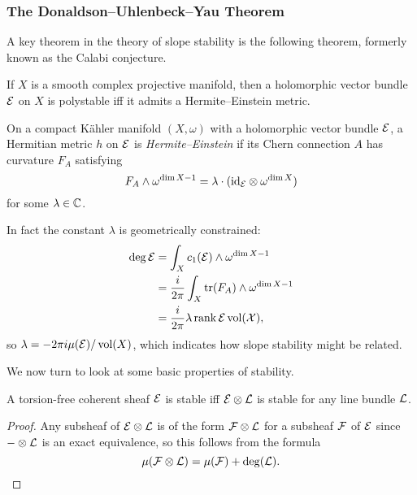 
\subsubsection{The Donaldson--Uhlenbeck--Yau Theorem}

A key theorem in the theory of slope stability is the following theorem,
formerly known as the Calabi conjecture.

\begin{theorem}
    If $X$ is a smooth complex projective manifold, then a holomorphic vector
    bundle $\mathcal{E}$ on $X$ is polystable iff it admits a Hermite--Einstein
    metric.
\end{theorem}

\begin{definition}
    On a compact K\"ahler manifold $(X,\omega)$ with a holomorphic vector bundle
    $\mathcal{E}$, a Hermitian metric $h$ on $\mathcal{E}$ is \emph{Hermite--Einstein} if
    its Chern connection $A$ has curvature $F_A$ satisfying
    \begin{equation*}
        F_A\wedge\omega^{\dim X-1}
            = \lambda\cdot(\mathrm{id}_{\mathcal{E}}\otimes\omega^{\dim X})
    \end{equation*}
    for some $\lambda\in\mathbb{C}$.
\end{definition}

In fact the constant $\lambda$ is geometrically constrained:
\begin{align*}
    \deg\mathcal{E}
        &= \int_Xc_1(\mathcal{E})\wedge\omega^{\dim X-1} \\
        &= \frac{i}{2\pi}\int_X\operatorname{tr}(F_A)\wedge\omega^{\dim X-1} \\
        &= \frac{i}{2\pi}\lambda\operatorname{rank}\cal E\operatorname{vol}(X),
\end{align*}
so $\lambda=-2\pi i\mu(\mathcal{E})/\operatorname{vol}(X)$, which indicates how slope stability
might be related.

We now turn to look at some basic properties of stability.

\begin{proposition}\label{prop:line}
    A torsion-free coherent sheaf $\mathcal{E}$ is stable iff $\mathcal{E}\otimes\mathcal{L}$ is
    stable for any line bundle $\mathcal{L}$.
\end{proposition}

\begin{proof}
    Any subsheaf of $\mathcal{E}\otimes\mathcal{L}$ is of the form $\mathcal{F}\otimes\mathcal{L}$ for
    a subsheaf $\mathcal{F}$ of $\mathcal{E}$ since $-\otimes\mathcal{L}$ is an exact equivalence,
    so this follows from the formula
    \begin{equation*}
        \mu(\mathcal{F}\otimes\mathcal{L}) = \mu(\mathcal{F}) + \deg(\mathcal{L}).
    \end{equation*}
\end{proof}


